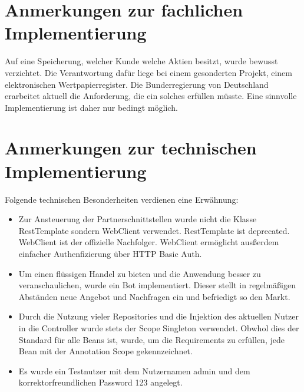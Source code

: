 \documentclass[12pt, a4paper, titlepage]{article}
\begin{document}
\section{Anmerkungen zur fachlichen Implementierung}
Auf eine Speicherung, welcher Kunde welche Aktien besitzt, wurde bewusst
verzichtet. Die Verantwortung dafür liege bei einem gesonderten Projekt,
einem elektronischen Wertpapierregister. Die Bunderregierung von Deutschland
erarbeitet aktuell die Anforderung, die ein solches erfüllen müsste.
Eine sinnvolle Implementierung ist daher nur bedingt möglich.

\section{Anmerkungen zur technischen Implementierung}
Folgende technischen Besonderheiten verdienen eine Erwähnung:
\begin{itemize}
	\item Zur Ansteuerung der Partnerschnittstellen wurde nicht die Klasse
	RestTemplate sondern WebClient verwendet. RestTemplate ist deprecated.
	WebClient ist der offizielle Nachfolger. WebClient ermöglicht ausßerdem
	einfacher Authenfizierung über HTTP Basic Auth.
	\item Um einen flüssigen Handel zu bieten und die Anwendung besser zu
	veranschaulichen, wurde ein Bot implementiert. Dieser stellt in regelmäßigen
	Abständen neue Angebot und Nachfragen ein und befriedigt so den Markt.
	\item Durch die Nutzung vieler Repositories und die Injektion des aktuellen
	Nutzer in die Controller wurde stets der Scope Singleton verwendet.
	Obwhol dies der Standard für alle Beans ist, wurde, um die Requirements zu
	erfüllen, jede Bean mit der Annotation Scope gekennzeichnet.
	\item Es wurde ein Testnutzer mit dem Nutzernamen admin und dem
	korrektorfreundlichen Password 123 angelegt.
\end{itemize}
\end{document}
